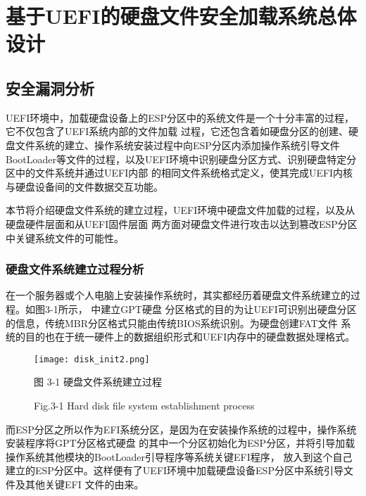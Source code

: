 %
%
\chapter{基于UEFI的硬盘文件安全加载系统总体设计}

%
%
\section{安全漏洞分析}
UEFI环境中，加载硬盘设备上的ESP分区中的系统文件是一个十分丰富的过程，它不仅包含了UEFI系统内部的文件加载
过程，它还包含着如硬盘分区的创建、硬盘文件系统的建立、操作系统安装过程中向ESP分区内添加操作系统引导文件
BootLoader等文件的过程，以及UEFI环境中识别硬盘分区方式、识别硬盘特定分区中的文件系统并通过UEFI内部
的相同文件系统格式定义，使其完成UEFI内核与硬盘设备间的文件数据交互功能。
\par 本节将介绍硬盘文件系统的建立过程，UEFI环境中硬盘文件加载的过程，以及从硬盘硬件层面和从UEFI固件层面
两方面对硬盘文件进行攻击以达到篡改ESP分区中关键系统文件的可能性。
\subsection{硬盘文件系统建立过程分析}
在一个服务器或个人电脑上安装操作系统时，其实都经历着硬盘文件系统建立的过程\cite{chinese22}。如图3-1所示，
中建立GPT硬盘
分区格式的目的为让UEFI可识别出硬盘分区的信息，传统MBR分区格式只能由传统BIOS系统识别。为硬盘创建FAT文件
系统的目的也在于统一硬件上的数据组织形式和UEFI内存中的硬盘数据处理格式\cite{extra1}。

\begin{figure}[htb]
    \vspace{0cm}   
    \setlength{\abovecaptionskip}{0.3cm}  
	\centering
    \texttt{[image: disk\_init2.png]}
    \caption*{图 3-1 硬盘文件系统建立过程}
    \setlength{\belowcaptionskip}{-0.7cm}
    \caption*{Fig.3-1 Hard disk file system establishment process}
\end{figure}

而ESP分区之所以作为EFI系统分区，是因为在安装操作系统的过程中，操作系统安装程序将GPT分区格式硬盘
的其中一个分区初始化为ESP分区，并将引导加载操作系统其他模块的BootLoader引导程序等系统关键EFI程序，
放入到这个自己建立的ESP分区中。这样便有了UEFI环境中加载硬盘设备ESP分区中系统引导文件及其他关键EFI
文件的由来\cite{addition1}。

